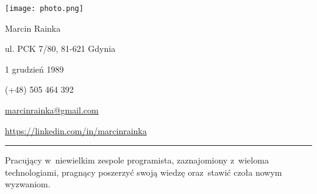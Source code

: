 \documentclass[11pt,a4paper]{article}
\begin{document}
    \pagestyle{empty}
  
    \noindent
    \begin{minipage}[b]{0.4\textwidth}
        \begin{center}
            \texttt{[image: photo.png]}
        \end{center}
    \end{minipage}
    \begin{minipage}[b]{0.6\textwidth}
        {\Huge \sc Marcin Rainka}
        \begin{description} \itemsep2pt \parskip0pt 
            \item[Adres] ul. PCK 7/80, 81-621 Gdynia
            \item[Data urodzenia] 1 grudzień 1989
            \item[Telefon] (+48) 505 464 392
            \item[E-mail] \href{mailto:marcinrainka@gmail.com}{marcinrainka@gmail.com}
            \item[LinkedIn] \url{https://linkedin.com/in/marcinrainka}
        \end{description}
    \end{minipage}
  
    \vspace{0.1cm}
  
    \noindent\rule{\textwidth}{0.4pt}
  
  
    \vspace{0.4cm}
  
    \smallskip
    \noindent
    Pracujący w~niewielkim zespole programista, zaznajomiony z~wieloma technologiami, pragnący poszerzyć swoją wiedzę oraz~stawić czoła nowym wyzwaniom.
  

    \vspace{0.5cm}
\end{document}
